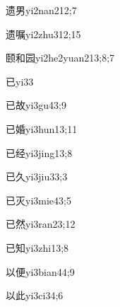 \begin{verbete}{遗男}{yi2nan2}{12;7}
\end{verbete}

\begin{verbete}{遗嘱}{yi2zhu3}{12;15}
\end{verbete}

\begin{verbete}{颐和园}{yi2he2yuan2}{13;8;7}
\end{verbete}

\begin{verbete}{已}{yi3}{3}
\end{verbete}

\begin{verbete}{已故}{yi3gu4}{3;9}
\end{verbete}

\begin{verbete}{已婚}{yi3hun1}{3;11}
\end{verbete}

\begin{verbete}{已经}{yi3jing1}{3;8}
\end{verbete}

\begin{verbete}{已久}{yi3jiu3}{3;3}
\end{verbete}

\begin{verbete}{已灭}{yi3mie4}{3;5}
\end{verbete}

\begin{verbete}{已然}{yi3ran2}{3;12}
\end{verbete}

\begin{verbete}{已知}{yi3zhi1}{3;8}
\end{verbete}

\begin{verbete}{以便}{yi3bian4}{4;9}
\end{verbete}

\begin{verbete}{以此}{yi3ci3}{4;6}
\end{verbete}


